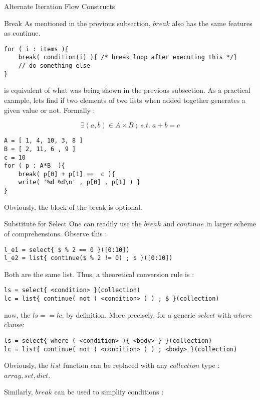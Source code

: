 \begin{section}{Alternate Iteration Flow Constructs}
\begin{subsection}{Break}
As mentioned in the previous subsection, 
$break$ also has the same features as continue. 

\begin{lstlisting}[style=JexlStyle]
for ( i : items ){
    break( condition(i) ){ /* break loop after executing this */} 
    // do something else 
}
\end{lstlisting}
is equivalent of what was being shown in the previous subsection.
As a practical example, lets find if two elements of two lists
when added together generates a given value or not.
Formally :

$$
\exists (a,b) \in A \times B \; ; \; s.t. \; a + b = c  
$$

\begin{lstlisting}[style=JexlStyle]
A = [ 1, 4, 10, 3, 8 ]
B = [ 2, 11, 6 , 9 ]
c = 10 
for ( p : A*B  ){
    break( p[0] + p[1] ==  c ){ 
    write( '%d %d\n' , p[0] , p[1] ) } 
}
\end{lstlisting}
Obviously, the block of the break is optional.
\end{subsection}

\begin{subsection}{Substitute for Select}
One can readily use the $break$ and $continue$ in larger scheme of comprehensions.
Observe this :

\begin{lstlisting}[style=JexlStyle]
l_e1 = select{ $ % 2 == 0 }([0:10])
l_e2 = list{ continue($ % 2 != 0) ; $ }([0:10])
\end{lstlisting}
Both are the same list. Thus, a theoretical conversion rule is :

\begin{lstlisting}[style=JexlStyle]
ls = select{ <condition> }(collection)
lc = list{ continue( not ( <condition> ) ) ; $ }(collection)
\end{lstlisting}
now, the $ls == lc$, by definition.
More precisely, for a generic $select$ with $where$ clause:

\begin{lstlisting}[style=JexlStyle]
ls = select{ where ( <condition> ){ <body> } }(collection)
lc = list{ continue( not ( <condition> ) ) ; <body> }(collection)
\end{lstlisting}
Obviously, the $list$ function can be replaced with any $collection$ type : $array, set, dict$.

Similarly, $break$ can be used to simplify conditions :


\end{subsection}
\end{section}

